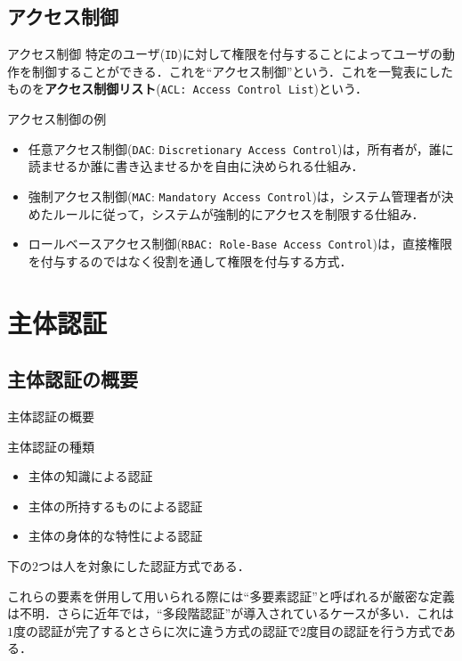 \documentclass[11pt, aspectratio=169]{beamer}
\begin{document}
\subsection{アクセス制御}

\begin{frame}{アクセス制御}
  特定のユーザ(\texttt{ID})に対して権限を付与することによってユーザの動作を制御することができる．これを``アクセス制御''という．これを一覧表にしたものを\textbf{アクセス制御リスト}(\texttt{ACL: Access Control List})という．
  \begin{block}{アクセス制御の例}
    \begin{itemize}
      \item 任意アクセス制御(\texttt{DAC}: \texttt{Discretionary Access Control})は，所有者が，誰に読ませるか誰に書き込ませるかを自由に決められる仕組み．

       \item 強制アクセス制御(\texttt{MAC}: \texttt{Mandatory Access Control})は，システム管理者が決めたルールに従って，システムが強制的にアクセスを制限する仕組み．
       \item ロールベースアクセス制御(\texttt{RBAC: Role-Base Access Control})は，直接権限を付与するのではなく役割を通して権限を付与する方式．
    \end{itemize}
  \end{block}
\end{frame}

\section{主体認証}
\subsection{主体認証の概要}

\begin{frame}{主体認証の概要}
  \begin{block}{主体認証の種類}
    \begin{itemize}
      \item 主体の知識による認証
      \item 主体の所持するものによる認証
      \item 主体の身体的な特性による認証
    \end{itemize}
  \end{block}
  下の$2$つは人を対象にした認証方式である．
  \vspace{1em}

  これらの要素を併用して用いられる際には``多要素認証''と呼ばれるが厳密な定義は不明．さらに近年では，``多段階認証''が導入されているケースが多い．これは$1$度の認証が完了するとさらに次に違う方式の認証で$2$度目の認証を行う方式である．
\end{frame}
\end{document}
